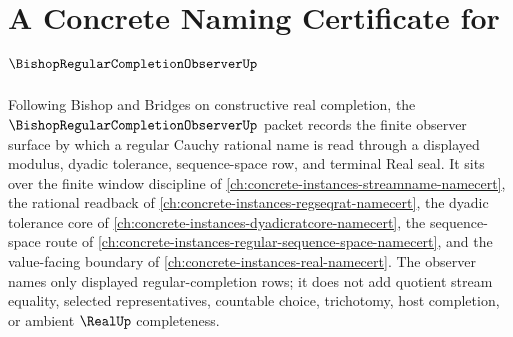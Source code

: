 \chapter{A Concrete Naming Certificate for $\BishopRegularCompletionObserverUp$}
\label{ch:concrete-instances-bishop-regular-completion-observer-namecert}

Following Bishop and Bridges on constructive real completion, the $\BishopRegularCompletionObserverUp$ packet records the finite observer surface by which a regular Cauchy rational name is read through a displayed modulus, dyadic tolerance, sequence-space row, and terminal Real seal. It sits over the finite window discipline of \autoref{ch:concrete-instances-streamname-namecert}, the rational readback of \autoref{ch:concrete-instances-regseqrat-namecert}, the dyadic tolerance core of \autoref{ch:concrete-instances-dyadicratcore-namecert}, the sequence-space route of \autoref{ch:concrete-instances-regular-sequence-space-namecert}, and the value-facing boundary of \autoref{ch:concrete-instances-real-namecert}. The observer names only displayed regular-completion rows; it does not add quotient stream equality, selected representatives, countable choice, trichotomy, host completion, or ambient $\RealUp$ completeness.

